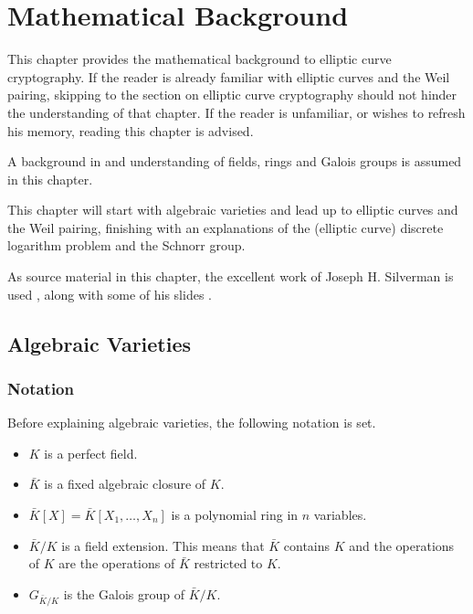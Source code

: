 \chapter{Mathematical Background}
This chapter provides the mathematical background to elliptic curve cryptography. If the reader is already familiar with elliptic curves and the Weil pairing, skipping to the section on elliptic curve cryptography should not hinder the understanding of that chapter. If the reader is unfamiliar, or wishes to refresh his memory, reading this chapter is advised.

A background in and understanding of fields, rings and Galois groups is assumed in this chapter.

This chapter will start with algebraic varieties and lead up to elliptic curves and the Weil pairing, finishing with an explanations of the (elliptic curve) discrete logarithm problem and the Schnorr group.

As source material in this chapter, the excellent work of Joseph H. Silverman is used \cite[Chapter 1-3]{EllipticCurvesBook}, along with some of his slides \cite{EllipticCurvesSlides}.

\section{Algebraic Varieties}
\subsection{Notation}
Before explaining algebraic varieties, the following notation is set.
\begin{itemize}
	\item $K$ is a perfect field.
	\item $\bar{K}$ is a fixed algebraic closure of $K$.
	\item $\bar{K}[X]=\bar{K}[X_1,\dots,X_n]$ is a polynomial ring in $n$ variables.
	\item $\bar{K}/K$ is a field extension. This means that $\bar{K}$ contains $K$ and the operations of $K$ are the operations of $\bar{K}$ restricted to $K$.
	\item $G_{\bar{K}/K}$ is the Galois group of $\bar{K}/K$.
\end{itemize}

